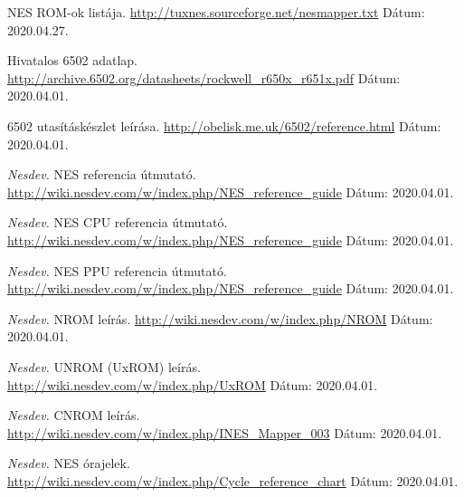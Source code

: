 \documentclass[
]{elteikthesis}[2020/02/26]
\begin{document}
\begin{thebibliography}{9}
	NES ROM-ok listája.
	\newline
	\url{http://tuxnes.sourceforge.net/nesmapper.txt}
	\newline Dátum: 2020.04.27.
	
	Hivatalos 6502 adatlap.
	\newline
	\url{http://archive.6502.org/datasheets/rockwell_r650x_r651x.pdf}
	\newline Dátum: 2020.04.01.
	
	6502 utasításkészlet leírása.
	\newline
	\url{http://obelisk.me.uk/6502/reference.html}
	\newline Dátum: 2020.04.01.
	
	\textit{Nesdev.}
	NES referencia útmutató.
	\newline
	\url{http://wiki.nesdev.com/w/index.php/NES_reference_guide}
	\newline Dátum: 2020.04.01.
	
	\textit{Nesdev.}
	NES CPU referencia útmutató.
	\newline
	\url{http://wiki.nesdev.com/w/index.php/NES_reference_guide}
	\newline Dátum: 2020.04.01.
	
	\textit{Nesdev.}
	NES PPU referencia útmutató.
	\newline
	\url{http://wiki.nesdev.com/w/index.php/NES_reference_guide}
	\newline Dátum: 2020.04.01.
	
	\textit{Nesdev.}
	NROM leírás.
	\newline
	\url{http://wiki.nesdev.com/w/index.php/NROM}
	\newline Dátum: 2020.04.01.
	
	\textit{Nesdev.}
	UNROM (UxROM) leírás.
	\newline
	\url{http://wiki.nesdev.com/w/index.php/UxROM}
	\newline Dátum: 2020.04.01.
	
	\textit{Nesdev.}
	CNROM leírás.
	\newline
	\url{http://wiki.nesdev.com/w/index.php/INES_Mapper_003}
	\newline Dátum: 2020.04.01.
	
	\textit{Nesdev.}
	NES órajelek.
	\newline
	\url{http://wiki.nesdev.com/w/index.php/Cycle_reference_chart}
	\newline Dátum: 2020.04.01.
	

\end{thebibliography}
\end{document}
